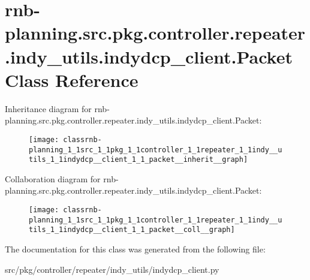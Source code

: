 \hypertarget{classrnb-planning_1_1src_1_1pkg_1_1controller_1_1repeater_1_1indy__utils_1_1indydcp__client_1_1_packet}{}\section{rnb-\/planning.src.\+pkg.\+controller.\+repeater.\+indy\+\_\+utils.\+indydcp\+\_\+client.\+Packet Class Reference}
\label{classrnb-planning_1_1src_1_1pkg_1_1controller_1_1repeater_1_1indy__utils_1_1indydcp__client_1_1_packet}


Inheritance diagram for rnb-\/planning.src.\+pkg.\+controller.\+repeater.\+indy\+\_\+utils.\+indydcp\+\_\+client.\+Packet\+:
\nopagebreak
\begin{figure}[H]
\begin{center}
\leavevmode
\texttt{[image: classrnb-planning\_1\_1src\_1\_1pkg\_1\_1controller\_1\_1repeater\_1\_1indy\_\_utils\_1\_1indydcp\_\_client\_1\_1\_packet\_\_inherit\_\_graph]}
\end{center}
\end{figure}


Collaboration diagram for rnb-\/planning.src.\+pkg.\+controller.\+repeater.\+indy\+\_\+utils.\+indydcp\+\_\+client.\+Packet\+:
\nopagebreak
\begin{figure}[H]
\begin{center}
\leavevmode
\texttt{[image: classrnb-planning\_1\_1src\_1\_1pkg\_1\_1controller\_1\_1repeater\_1\_1indy\_\_utils\_1\_1indydcp\_\_client\_1\_1\_packet\_\_coll\_\_graph]}
\end{center}
\end{figure}


The documentation for this class was generated from the following file\+:\begin{DoxyCompactItemize}
\item 
src/pkg/controller/repeater/indy\+\_\+utils/indydcp\+\_\+client.\+py\end{DoxyCompactItemize}
